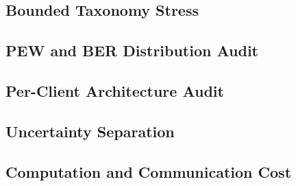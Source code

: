 \subsection{Bounded Taxonomy Stress}


\subsection{PEW and BER Distribution Audit}


\subsection{Per-Client Architecture Audit}


\subsection{Uncertainty Separation}


\subsection{Computation and Communication Cost}

